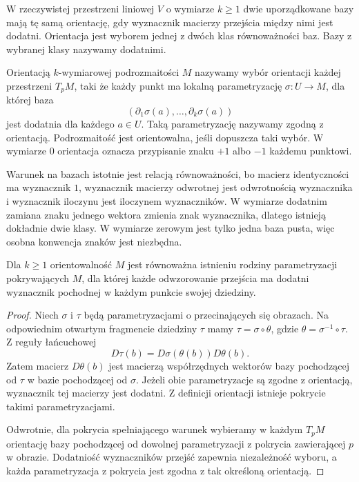 \begin{definicja}
\label{ma2:def:manifold-orientation}
W rzeczywistej przestrzeni liniowej $V$ o wymiarze
$k\ge1$ dwie uporządkowane bazy mają tę samą orientację,
gdy wyznacznik macierzy przejścia między nimi jest
dodatni. Orientacja jest wyborem jednej z dwóch
klas równoważności baz. Bazy z wybranej klasy nazywamy
dodatnimi.

Orientacją $k$-wymiarowej podrozmaitości $M$ nazywamy
wybór orientacji każdej przestrzeni $T_pM$, taki że
każdy punkt ma lokalną parametryzację $\sigma:U\to M$,
dla której baza
\[
 (\partial_1\sigma(a),\ldots,\partial_k\sigma(a))
\]
jest dodatnia dla każdego $a\in U$. Taką parametryzację
nazywamy zgodną z orientacją. Podrozmaitość jest
orientowalna, jeśli dopuszcza taki wybór.
W wymiarze $0$ orientacja oznacza przypisanie znaku
$+1$ albo $-1$ każdemu punktowi.
\end{definicja}

Warunek na bazach istotnie jest relacją równoważności,
bo macierz identyczności ma wyznacznik $1$,
wyznacznik macierzy odwrotnej jest odwrotnością
wyznacznika i wyznacznik iloczynu jest iloczynem
wyznaczników. W wymiarze dodatnim zamiana znaku
jednego wektora zmienia znak wyznacznika, dlatego
istnieją dokładnie dwie klasy. W wymiarze zerowym
jest tylko jedna baza pusta, więc osobna konwencja
znaków jest niezbędna.

\begin{stwierdzenie}
\label{ma2:prop:orientation-transitions}
Dla $k\ge1$ orientowalność $M$ jest równoważna
istnieniu rodziny parametryzacji pokrywających $M$,
dla której każde odwzorowanie przejścia ma dodatni
wyznacznik pochodnej w każdym punkcie swojej dziedziny.
\end{stwierdzenie}
\begin{proof}
Niech $\sigma$ i $\tau$ będą parametryzacjami
o przecinających się obrazach. Na odpowiednim
otwartym fragmencie dziedziny $\tau$ mamy
$\tau=\sigma\circ\theta$, gdzie
$\theta=\sigma^{-1}\circ\tau$. Z reguły łańcuchowej
\[
 D\tau(b)=D\sigma(\theta(b))D\theta(b).
\]
Zatem macierz $D\theta(b)$ jest macierzą
współrzędnych wektorów bazy pochodzącej od $\tau$
w bazie pochodzącej od $\sigma$. Jeżeli obie
parametryzacje są zgodne z orientacją, wyznacznik
tej macierzy jest dodatni. Z definicji orientacji
istnieje pokrycie takimi parametryzacjami.

Odwrotnie, dla pokrycia spełniającego warunek
wybieramy w każdym $T_pM$ orientację bazy
pochodzącej od dowolnej parametryzacji z pokrycia
zawierającej $p$ w obrazie. Dodatniość wyznaczników
przejść zapewnia niezależność wyboru, a każda
parametryzacja z pokrycia jest zgodna z tak określoną
orientacją.
\end{proof}

